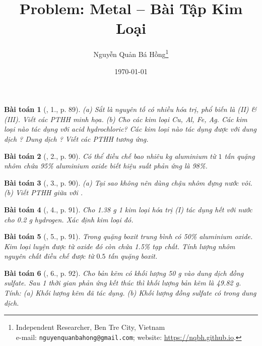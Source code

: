 \documentclass{article}
\title{Problem: Metal -- Bài Tập Kim Loại}
\author{Nguyễn Quản Bá Hồng\footnote{Independent Researcher, Ben Tre City, Vietnam\\e-mail: \texttt{nguyenquanbahong@gmail.com}; website: \url{https://nqbh.github.io}.}}
\date{\today}
\newtheorem{baitoan}{Bài toán}
\begin{document}
\maketitle
\begin{abstract}
	
\end{abstract}
\setcounter{secnumdepth}{4}
\setcounter{tocdepth}{3}
\tableofcontents


\begin{baitoan}[\cite{An_Hoa_Hoc_nang_cao_8_9}, 1., p. 89]
	(a) Sắt là nguyên tố có nhiều hóa trị, phổ biến là (II) \& (III). Viết các {\rm PTHH} minh họa. (b) Cho các kim loại {\rm Cu, Al, Fe, Ag}. Các kim loại nào tác dụng với acid hydrochloric? Các kim loại nào tác dụng được với dung dịch {\rm{}}? Dung dịch {\rm{}}? Viết các {\rm PTHH} tương ứng.
\end{baitoan}

\begin{baitoan}[\cite{An_Hoa_Hoc_nang_cao_8_9}, 2., p. 90]
	Có thể điều chế bao nhiêu {\rm kg} aluminium từ $1$ tấn quặng nhôm chứa {\rm95\%} aluminium oxide biết hiệu suất phản ứng là {\rm98\%}.
\end{baitoan}

\begin{baitoan}[\cite{An_Hoa_Hoc_nang_cao_8_9}, 3., p. 90]
	(a) Tại sao không nên dùng chậu nhôm đựng nước vôi. (b) Viết PTHH giữa {\rm{}} với {\rm{}}.
\end{baitoan}

\begin{baitoan}[\cite{An_Hoa_Hoc_nang_cao_8_9}, 4., p. 91]
	Cho {\rm1.38 g} 1 kim loại hóa trị (I) tác dụng hết với nước cho {\rm0.2 g} hydrogen. Xác định kim loại đó.
\end{baitoan}

\begin{baitoan}[\cite{An_Hoa_Hoc_nang_cao_8_9}, 5., p. 91]
	Trong quặng boxit trung bình có {\rm50\%} aluminium oxide. Kim loại luyện được từ oxide đó còn chứa {\rm1.5\%} tạp chất. Tính lượng nhôm nguyên chất điều chế được từ $0.5$ tấn quặng boxit.
\end{baitoan}

\begin{baitoan}[\cite{An_Hoa_Hoc_nang_cao_8_9}, 6., p. 92]
	Cho bản kẽm có khối lượng {\rm50 g} vào dung dịch đồng sulfate. Sau 1 thời gian phản ứng kết thúc thì khối lượng bản kẽm là {\rm49.82 g}. Tính: (a) Khối lượng kẽm đã tác dụng. (b) Khối lượng đồng sulfate có trong dung dịch.
\end{baitoan}
\end{document}
